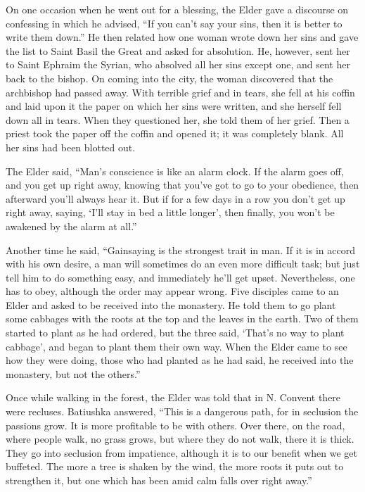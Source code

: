 On one occasion when he went out for a blessing, the Elder gave a discourse on confessing in which he advised, ``If you can't say your sins, then it is better to write them down.'' He then related how one woman wrote down her sins and gave the list to Saint Basil the Great and asked for absolution. He, however, sent her to Saint Ephraim the Syrian, who absolved all her sins except one, and sent her back to the bishop. On coming into the city, the woman discovered that the archbishop had passed away. With terrible grief and in tears, she fell at his coffin and laid upon it the paper on which her sins were written, and she herself fell down all in tears. When they questioned her, she told them of her grief. Then a priest took the paper off the coffin and opened it; it was completely blank. All her sins had been blotted out.

The Elder said, ``Man's conscience is like an alarm clock. If the alarm goes off, and you get up right away, knowing that you've got to go to your obedience, then afterward you'll always hear it. But if for a few days in a row you don't get up right away, saying, `I'll stay in bed a little longer', then finally, you won't be awakened by the alarm at all.''

Another time he said, ``Gainsaying is the strongest trait in man. If it is in accord with his own desire, a man will sometimes do an even more difficult task; but just tell him to do something easy, and immediately he'll get upset. Nevertheless, one has to obey, although the order may appear wrong. Five disciples came to an Elder and asked to be received into the monastery. He told them to go plant some cabbages with the roots at the top and the leaves in the earth. Two of them started to plant as he had ordered, but the three said, `That's no way to plant cabbage', and began to plant them their own way. When the Elder came to see how they were doing, those who had planted as he had said, he received into the monastery, but not the others.''

Once while walking in the forest, the Elder was told that in N. Convent there were recluses. Batiushka answered, ``This is a dangerous path, for in seclusion the passions grow. It is more profitable to be with others. Over there, on the road, where people walk, no grass grows, but where they do not walk, there it is thick. They go into seclusion from impatience, although it is to our benefit when we get buffeted. The more a tree is shaken by the wind, the more roots it puts out to strengthen it, but one which has been amid calm falls over right away.''


